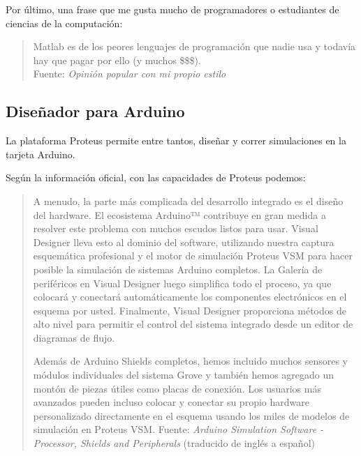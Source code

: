\documentclass{article}
\begin{document}
    \bigbreak

    Por último, una frase que me gusta mucho de programadores o estudiantes
    de ciencias de la computación:

    \begin{quote}
        Matlab es de los peores lenguajes de programación que nadie usa y
        todavía hay que pagar por ello (y muchos \$\$\$).\\ \footnotesize
        Fuente: \textit{Opinión popular con mi propio estilo}
    \end{quote}

    \subsection{Diseñador para Arduino}\label{subsec:diseñador-para-arduino}

    La plataforma Proteus permite entre tantos, diseñar y correr simulaciones
    en la tarjeta Arduino.

    \bigbreak

    Según la información oficial, con las capacidades de Proteus podemos:

    \begin{quote}
        A menudo, la parte más complicada del desarrollo integrado es el
        diseño del hardware. El ecosistema Arduino™ contribuye en gran medida
        a resolver este problema con muchos escudos listos para usar. Visual
        Designer lleva esto al dominio del software, utilizando nuestra
        captura esquemática profesional y el motor de simulación Proteus VSM
        para hacer posible la simulación de sistemas Arduino completos. La
        Galería de periféricos en Visual Designer luego simplifica todo el
        proceso, ya que colocará y conectará automáticamente los componentes
        electrónicos en el esquema por usted. Finalmente, Visual Designer
        proporciona métodos de alto nivel para permitir el control del
        sistema integrado desde un editor de diagramas de flujo.

        \bigbreak

        Además de Arduino Shields completos, hemos incluido muchos sensores y
        módulos individuales del sistema Grove y también hemos agregado un
        montón de piezas útiles como placas de conexión. Los usuarios más
        avanzados pueden incluso colocar y conectar su propio hardware
        personalizado directamente en el esquema usando los miles de modelos
        de simulación en Proteus VSM.\bigbreak \footnotesize
        Fuente: \textit{Arduino Simulation Software - Processor, Shields and
        Peripherals} (traducido de inglés a español)~\cite{labcenter-electronics-2022}
    \end{quote}
\end{document}
